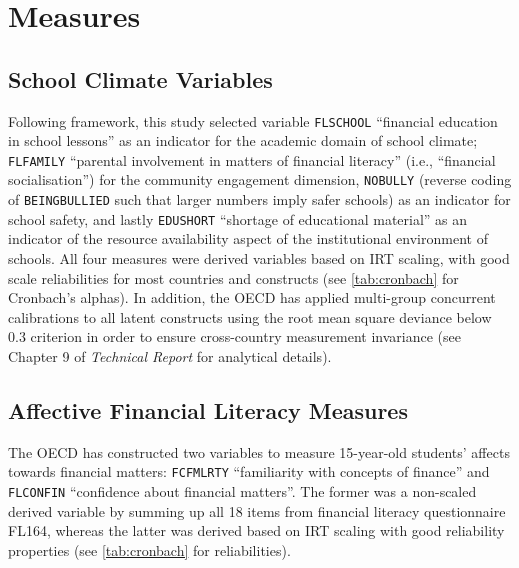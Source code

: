 \documentclass[a4paper,11pt,UKenglish,twoside,openright]{report}\usepackage[]{graphicx}\usepackage[]{color}
\begin{document}
\section{Measures}

\subsection{School Climate Variables}

Following  framework, this study selected variable \texttt{FLSCHOOL} ``financial education in school lessons'' as an indicator for the academic domain of school climate; \texttt{FLFAMILY} ``parental involvement in matters of financial literacy'' (i.e., ``financial socialisation'') for the community engagement dimension, \texttt{NOBULLY} (reverse coding of \texttt{BEINGBULLIED} such that larger numbers imply safer schools) as an indicator for school safety, and lastly \texttt{EDUSHORT} ``shortage of educational material'' as an indicator of the resource availability aspect of the institutional environment of schools. All four measures were derived variables based on IRT scaling, with good scale reliabilities for most countries and constructs (see \cref{tab:cronbach} for Cronbach's alphas). In addition, the OECD has applied multi-group concurrent calibrations to all latent constructs using the root mean square deviance below $0.3$ criterion \parencite[for a technical discussion on RMSD, see][p. 244]{buchholz:2019} in order to ensure cross-country measurement invariance (see Chapter 9 of \textit{Technical Report} \parencite[][pp. 14--15]{PISAtech} for analytical details).



\subsection{Affective Financial Literacy Measures}

The OECD has constructed two variables to measure 15-year-old students' affects towards financial matters: \texttt{FCFMLRTY} ``familiarity with concepts of finance'' and \texttt{FLCONFIN} ``confidence about financial matters''. The former was a non-scaled derived variable by summing up all 18 items from financial literacy questionnaire \textsf{FL164}, whereas the latter was derived based on IRT scaling with good reliability properties (see \cref{tab:cronbach} for reliabilities).
\end{document}
